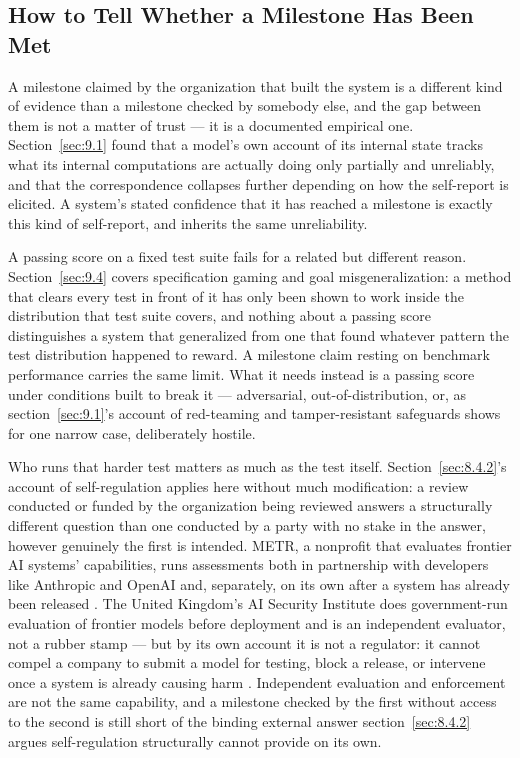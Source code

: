 \subsection{How to Tell Whether a Milestone Has Been Met}
\label{sec:10.2.2}
A milestone claimed by the organization that built the system is a different kind of evidence than a milestone checked by somebody else, and the gap between them is not a matter of trust — it is a documented empirical one. Section~\ref{sec:9.1} found that a model's own account of its internal state tracks what its internal computations are actually doing only partially and unreliably, and that the correspondence collapses further depending on how the self-report is elicited. A system's stated confidence that it has reached a milestone is exactly this kind of self-report, and inherits the same unreliability.

A passing score on a fixed test suite fails for a related but different reason. Section~\ref{sec:9.4} covers specification gaming and goal misgeneralization: a method that clears every test in front of it has only been shown to work inside the distribution that test suite covers, and nothing about a passing score distinguishes a system that generalized from one that found whatever pattern the test distribution happened to reward. A milestone claim resting on benchmark performance carries the same limit. What it needs instead is a passing score under conditions built to break it — adversarial, out-of-distribution, or, as section~\ref{sec:9.1}'s account of red-teaming and tamper-resistant safeguards shows for one narrow case, deliberately hostile.

Who runs that harder test matters as much as the test itself. Section~\ref{sec:8.4.2}'s account of self-regulation applies here without much modification: a review conducted or funded by the organization being reviewed answers a structurally different question than one conducted by a party with no stake in the answer, however genuinely the first is intended. METR, a nonprofit that evaluates frontier AI systems' capabilities, runs assessments both in partnership with developers like Anthropic and OpenAI and, separately, on its own after a system has already been released \autocite{metr2026about}. The United Kingdom's AI Security Institute does government-run evaluation of frontier models before deployment and is an independent evaluator, not a rubber stamp — but by its own account it is not a regulator: it cannot compel a company to submit a model for testing, block a release, or intervene once a system is already causing harm \autocite{aisi2025governance}. Independent evaluation and enforcement are not the same capability, and a milestone checked by the first without access to the second is still short of the binding external answer section~\ref{sec:8.4.2} argues self-regulation structurally cannot provide on its own.

